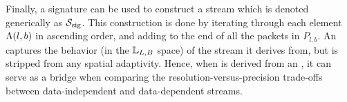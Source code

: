 Finally, a signature can be used to construct a stream which is denoted generically as $\ssig$. This
construction is done by iterating through each element $\sgn(l,b)$ in ascending order, and adding to
the end of \ssig all the packets in $P_{l,b}$. An \ssig captures the behavior (in the ${\mathbb L}_{L,B}$
space) of the stream it derives from, but is stripped from any spatial adaptivity. Hence, when \ssig
is derived from an \sopt, it can serve as a bridge when comparing the resolution-versus-precision
trade-offs between data-independent and data-dependent streams.